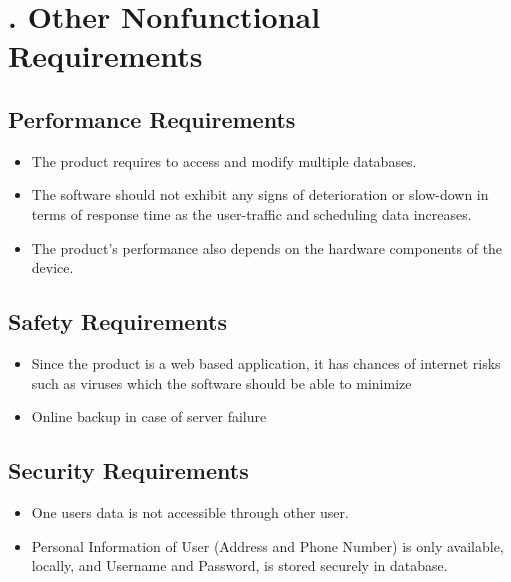 \documentclass{scrreprt}
\begin{document}
\chapter{. Other Nonfunctional Requirements}

\section{Performance Requirements}
\begin{itemize}
    \item  The product requires to access and modify multiple databases.\\
    \item The software should not exhibit any signs of deterioration or slow-down in
terms of response time as the user-traffic and scheduling data increases. \\
\item The product’s performance also depends on the hardware components of the
device.\\
\end{itemize}
 


\section{Safety Requirements}
\begin{itemize}
    \item Since the product is a web based application, it has chances of internet risks such
as viruses which the software should be able to minimize \\
\item Online backup in case of server failure\\
\end{itemize}

\section{Security Requirements}
\begin{itemize}
    \item One users data is not accessible through other user.\\
    \item Personal Information of User (Address and Phone Number) is only available, locally, and Username and Password, is stored securely in database.\\

\end{itemize}
\end{document}
